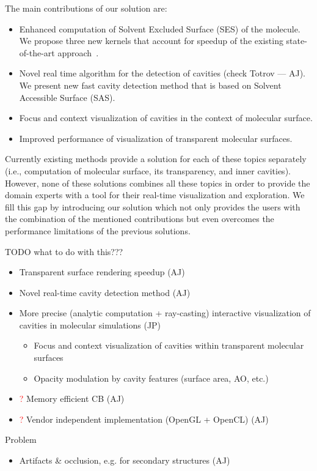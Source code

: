 The main contributions of our solution are:
\begin{itemize}
  \item Enhanced computation of Solvent Excluded Surface (SES) of the molecule. We propose three new kernels that account for speedup of the existing state-of-the-art approach~\cite{todo}.
  \item Novel real time algorithm for the detection of cavities (check Totrov --- AJ). We present new fast cavity detection method that is based on Solvent Accessible Surface (SAS).
  \item Focus and context visualization of cavities in the context of molecular surface.
  \item Improved performance of visualization of transparent molecular surfaces.~\cite{todo}
\end{itemize}

Currently existing methods provide a solution for each of these topics separately (i.e., computation of molecular surface, its transparency, and inner cavities).
However, none of these solutions combines all these topics in order to provide the domain experts with a tool for their real-time visualization and exploration.
We fill this gap by introducing our solution which not only provides the users with the combination of the mentioned contributions but even overcomes the performance limitations of the previous solutions.


TODO what to do with this???
\begin{itemize}
  \item Transparent surface rendering speedup (AJ)
	\item Novel real-time cavity detection method (AJ)
	\item More precise (analytic computation + ray-casting) interactive visualization of cavities in molecular simulations (JP)
	\begin{itemize}
		\item Focus and context visualization of cavities within transparent molecular surfaces
		\item Opacity modulation by cavity features (surface area, AO, etc.)
	\end{itemize}
	\item \textcolor{red}{?} Memory efficient CB (AJ)
	\item \textcolor{red}{?} Vendor independent implementation (OpenGL + OpenCL) (AJ)
\end{itemize}

Problem
\begin{itemize}
  \item Artifacts \& occlusion, e.g. for secondary structures (AJ)
\end{itemize}



